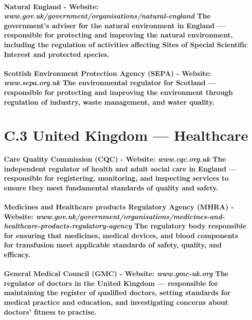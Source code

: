 \paragraph{\textbf{Natural England} - Website: \textit{www.gov.uk/government/organisations/natural-england} The government's adviser for the natural environment in England — responsible for protecting and improving the natural environment, including the regulation of activities affecting Sites of Special Scientific Interest and protected species.}
\paragraph{\textbf{Scottish Environment Protection Agency (SEPA)} - Website: \textit{www.sepa.org.uk} The environmental regulator for Scotland — responsible for protecting and improving the environment through regulation of industry, waste management, and water quality.}

\section*{C.3 United Kingdom — Healthcare}
\paragraph{\textbf{Care Quality Commission (CQC)} - Website: \textit{www.cqc.org.uk} The independent regulator of health and adult social care in England — responsible for registering, monitoring, and inspecting services to ensure they meet fundamental standards of quality and safety.}
\paragraph{\textbf{Medicines and Healthcare products Regulatory Agency (MHRA)} - Website: \textit{www.gov.uk/government/organisations/medicines-and-healthcare-products-regulatory-agency} The regulatory body responsible for ensuring that medicines, medical devices, and blood components for transfusion meet applicable standards of safety, quality, and efficacy.}
\paragraph{\textbf{General Medical Council (GMC)} - Website: \textit{www.gmc-uk.org} The regulator of doctors in the United Kingdom — responsible for maintaining the register of qualified doctors, setting standards for medical practice and education, and investigating concerns about doctors' fitness to practise.}
